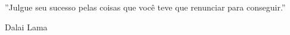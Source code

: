 \begin{flushright}
\begin{minipage}[r]{10cm}
\vspace{18cm}
''Julgue seu sucesso pelas coisas que você teve que renunciar para conseguir.''
\begin{flushright}
Dalai Lama
\end{flushright}
\end{minipage}
\end{flushright}